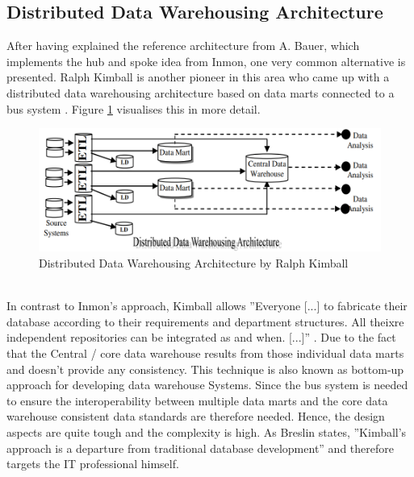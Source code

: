\subsection{Distributed Data Warehousing Architecture}
After having explained the reference architecture from A. Bauer, which implements the hub and spoke idea from Inmon, one very common alternative is presented. Ralph Kimball is another pioneer in this area who came up with a distributed data warehousing architecture based on data marts connected to a bus system \cite{surveyDWSArchs}. Figure \ref{fig:distributedWarehouseArchitecture} visualises this in more detail.
\begin{figure}[htb]
    \centering
    \includegraphics[scale=0.5]{pictures/DistributedDataWarehouseArchitecture.PNG}
    \caption{Distributed Data Warehousing Architecture by Ralph Kimball \cite{surveyDWSArchs}}
    \label{fig:distributedWarehouseArchitecture}
\end{figure}
\\In contrast to Inmon's approach, Kimball allows ''Everyone [...] to fabricate their database according to their requirements and department structures. All theixre independent repositories can be integrated as and when. [...]'' \cite{surveyDWSArchs}. Due to the fact that the Central / core data warehouse results from those individual data marts and doesn't provide any consistency. This technique is also known as bottom-up approach for developing data warehouse Systems. Since the bus system is needed to ensure the interoperability between multiple data marts and the core data warehouse consistent data standards are therefore needed. Hence, the design aspects are quite tough and the complexity is high. \cite{KimbalVSInmon}\newline
As Breslin states, ''Kimball's approach is a departure from traditional database development'' \cite[p.~19]{KimbalVSInmon} and therefore targets the IT professional himself.\newline

